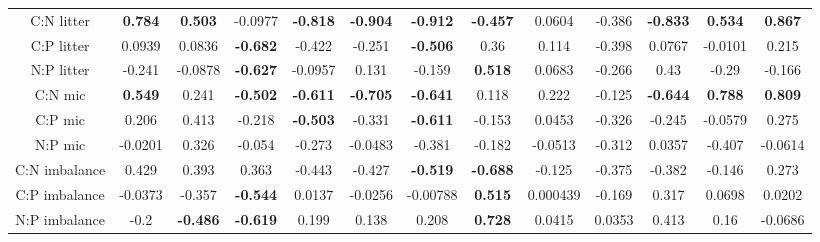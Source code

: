 \documentclass[authoryear,preprint,review,12pt]{elsarticle}
\begin{document}
\begin{landscape}
\begin{table}[h!]
\begin{center}
{\begin{tabular}{ccccccccccccc}
  C:N litter & \textbf{ 0.784 } & \textbf{ 0.503 } & -0.0977 & \textbf{ -0.818 } & \textbf{ -0.904 } & \textbf{ -0.912 } & \textbf{ -0.457 } & 0.0604 & -0.386 & \textbf{ -0.833 } & \textbf{ 0.534 } & \textbf{ 0.867 } \\ 
  C:P litter & 0.0939 & 0.0836 & \textbf{ -0.682 } & -0.422 & -0.251 & \textbf{ -0.506 } & 0.36 & 0.114 & -0.398 & 0.0767 & -0.0101 & 0.215 \\ 
  N:P litter & -0.241 & -0.0878 & \textbf{ -0.627 } & -0.0957 & 0.131 & -0.159 & \textbf{ 0.518 } & 0.0683 & -0.266 & 0.43 & -0.29 & -0.166 \\ 
  C:N mic & \textbf{ 0.549 } & 0.241 & \textbf{ -0.502 } & \textbf{ -0.611 } & \textbf{ -0.705 } & \textbf{ -0.641 } & 0.118 & 0.222 & -0.125 & \textbf{ -0.644 } & \textbf{ 0.788 } & \textbf{ 0.809 } \\ 
  C:P mic & 0.206 & 0.413 & -0.218 & \textbf{ -0.503 } & -0.331 & \textbf{ -0.611 } & -0.153 & 0.0453 & -0.326 & -0.245 & -0.0579 & 0.275 \\ 
  N:P mic & -0.0201 & 0.326 & -0.054 & -0.273 & -0.0483 & -0.381 & -0.182 & -0.0513 & -0.312 & 0.0357 & -0.407 & -0.0614 \\ 
  C:N imbalance & 0.429 & 0.393 & 0.363 & -0.443 & -0.427 & \textbf{ -0.519 } & \textbf{ -0.688 } & -0.125 & -0.375 & -0.382 & -0.146 & 0.273 \\ 
  C:P imbalance & -0.0373 & -0.357 & \textbf{ -0.544 } & 0.0137 & -0.0256 & -0.00788 & \textbf{ 0.515 } & 0.000439 & -0.169 & 0.317 & 0.0698 & 0.0202 \\ 
  N:P imbalance & -0.2 & \textbf{ -0.486 } & \textbf{ -0.619 } & 0.199 & 0.138 & 0.208 & \textbf{ 0.728 } & 0.0415 & 0.0353 & 0.413 & 0.16 & -0.0686 \\ 
   \hline
\end{tabular}
}
\end{center}
\end{table}\end{landscape}
\end{document}
